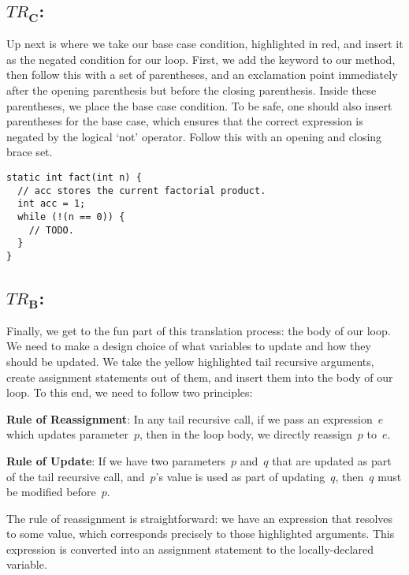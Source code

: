 \subsection{\emph{$TR_\mathbf{C}$}:} Up next is where we take our base case condition, highlighted in red, and insert it as the negated condition for our loop. 
First, we add the  keyword to our method, then follow this with a set of parentheses, and an exclamation point immediately after the opening parenthesis but before the closing parenthesis. 
Inside these parentheses, we place the base case condition. 
To be safe, one should also insert parentheses for the base case, which ensures that the correct expression is negated by the logical `not' operator. 
Follow this with an opening and closing brace set.

\begin{lstlisting}[language=MyJava]
static int fact(int n) {
  // acc stores the current factorial product. 
  int acc = 1;
  while (!(n == 0)) { 
    // TODO.
  }
}
\end{lstlisting}

\subsection{\emph{$TR_\mathbf{B}$}:} Finally, we get to the fun part of this translation process: the body of our loop. 
We need to make a design choice of what variables to update and how they should be updated. 
We take the \textcolor{darkyellow}{yellow} highlighted tail recursive arguments, create assignment statements out of them, and insert them into the body of our loop. 
To this end, we need to follow two principles:

\textbf{Rule of Reassignment}: In any tail recursive call, if we pass an expression~$e$ which updates parameter~$p$, then in the loop body, we directly reassign~$p$ to~$e$.

\textbf{Rule of Update}: If we have two parameters~$p$ and~$q$ that are updated as part of the tail recursive call, and~$p$'s value is used as part of updating~$q$, then~$q$ must be modified before~$p$.

The rule of reassignment is straightforward: we have an expression that resolves to some value, which corresponds precisely to those highlighted arguments. 
This expression is converted into an assignment statement to the locally-declared variable. 

